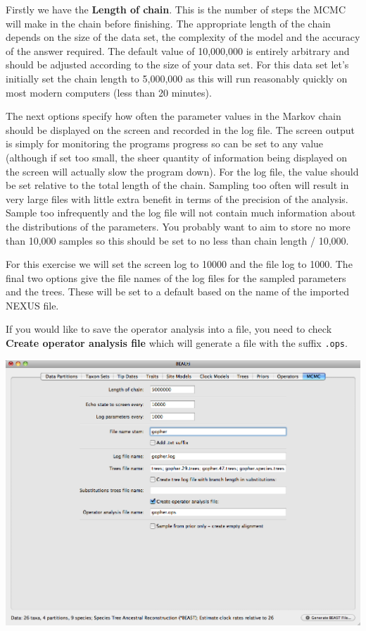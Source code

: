 \documentclass[12pt]{article}
\begin{document}
Firstly we have the \textbf{Length of chain}. This is the number of
steps the MCMC will make in the chain before finishing. The appropriate length of the chain depends on the size of the data set, the complexity of the
model and the accuracy of the answer required. The default value of 10,000,000
is entirely arbitrary and should be adjusted according to the size
of your data set. For this data set let's initially set the chain
length to 5,000,000 as this will run reasonably quickly on most modern
computers (less than 20 minutes).

The next options specify how often the parameter values in the Markov
chain should be displayed on the screen and recorded in the log file.
The screen output is simply for monitoring the programs progress so
can be set to any value (although if set too small, the sheer quantity
of information being displayed on the screen will actually slow the
program down). For the log file, the value should be set relative
to the total length of the chain. Sampling too often will result in
very large files with little extra benefit in terms of the precision
of the analysis. Sample too infrequently and the log file will not
contain much information about the distributions of the parameters. 
You probably want to aim to store no more than 10,000 samples so this should be
set to no less than chain length / 10,000.

For this exercise we will set the screen log to 10000 and the file log to 1000. The final two
options give the file names of the log files for the sampled parameters and
the trees. These will be set to a default based on the name of the
imported NEXUS file. 

If you would like to save the operator analysis into a file, you need to check  \textbf{Create operator analysis file} which will generate a file with the suffix \texttt{.ops}. 

\medskip{}

\includegraphics[scale=0.4]{figures/BEAUti_MCMC}
\end{document}

